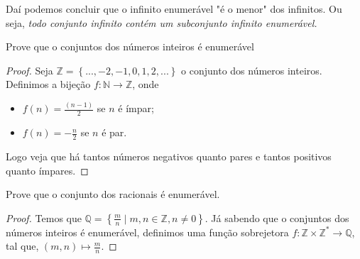 Daí podemos concluir que o infinito enumerável "é o menor" dos infinitos. Ou seja, \textit{todo conjunto infinito contém um subconjunto infinito enumerável.}

\begin{prob}
Prove que o conjuntos dos números inteiros é enumerável
\end{prob}

\begin{proof}
Seja $\mathbb{Z}=\left \{ ...,-2,-1,0,1,2,... \right \}$ o conjunto dos números inteiros. Definimos a bijeção $f:\mathbb{N}\rightarrow \mathbb{Z}$, onde \begin{itemize}
    \item $f(n)=\frac{(n-1)}{2}$ se $n$ é ímpar;
    \item $f(n)=-\frac{n}{2}$ se $n$ é par.
\end{itemize}
Logo veja que há tantos números negativos quanto pares e tantos positivos quanto ímpares.
\end{proof}

\begin{prob}
Prove que o conjunto dos racionais é enumerável.
\end{prob}
\begin{proof}
Temos que $\mathbb{Q}=\left \{ \frac{m}{n} \mid m,n \in \mathbb{Z}, n \neq 0 \right \}$. Já sabendo que o conjuntos dos números inteiros é enumerável, definimos uma função sobrejetora $f:\mathbb{Z}\times \mathbb{Z}^{\ast }\rightarrow \mathbb{Q}$, tal que, $(m,n)\mapsto \frac{m}{n}$.
\end{proof}